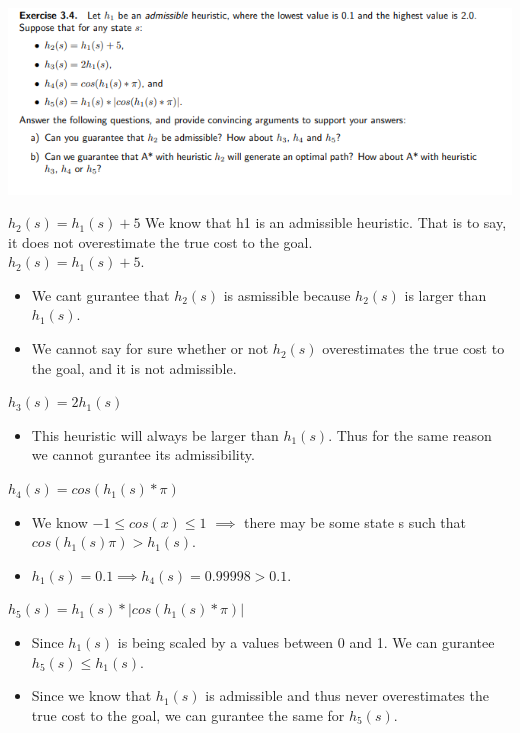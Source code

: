 \documentclass[11pt]{beamer}
\begin{document}
\begin{frame}{3.4}
\includegraphics[scale=0.5]{34question.png}
\end{frame}

\begin{frame}{$h_2(s) = h_1(s)+5$}
\pause
We know that h1 is an admissible heuristic. That is to say, it does not overestimate the true cost to the goal.\\
$h_2(s) = h_1(s)+5$. 
\begin{itemize}
	\item We cant gurantee that $h_2(s)$ is asmissible because $h_2(s)$ is larger than $h_1(s)$. \pause
	\item We cannot say for sure whether or not $h_2(s)$ overestimates the true cost to the goal, and it is not admissible.
\end{itemize}
\end{frame}

\begin{frame}{$h_3(s) = 2h_1(s)$}
\pause
\begin{itemize}
	\item This heuristic will always be larger than $h_1(s)$. Thus for the same reason we cannot gurantee its admissibility.
\end{itemize}
\end{frame}

\begin{frame}{$h_4(s)=cos(h_1(s)* \pi)$}
\pause
\begin{itemize}
	\item We know $-1 \leq cos(x) \leq 1$ $\implies$ there may be some state s such that $cos(h_1(s)\pi)>h_1(s)$.
	\item $h_1(s)=0.1 \implies h_4(s)=0.99998>0.1$.
\end{itemize}
\end{frame}

\begin{frame}{$h_5(s)= h_1(s)*|cos(h_1(s)*\pi)|$}
\pause
\begin{itemize}
	\item Since $h_1(s)$ is being scaled by a values between 0 and 1. We can gurantee $h_5(s)\leq h_1(s)$.
	\item Since we know that $h_1(s)$ is admissible and thus never overestimates the true cost to the goal, we can gurantee the same for $h_5(s)$.
\end{itemize}
\end{frame}
\end{document}
